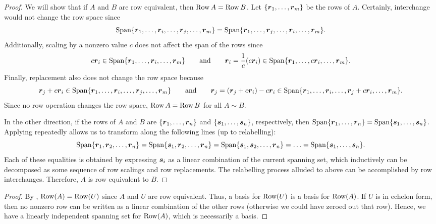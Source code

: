 \begin{proof} We will show that if $A$ and $B$ are row equivalent, then $\operatorname*{Row} A = \operatorname*{Row} B$. Let $\{\boldsymbol r_1, \ldots, \boldsymbol r_m\}$ be the rows of $A$. Certainly, interchange would not change the row space since 
\[\operatorname{Span}\{\boldsymbol r_1, \ldots, \boldsymbol r_i, \ldots, \boldsymbol r_j,\ldots, \boldsymbol r_m\} = \operatorname{Span}\{\boldsymbol r_1, \ldots, \boldsymbol r_j, \ldots, \boldsymbol r_i,\ldots, \boldsymbol r_m\}.\] Additionally, scaling by a nonzero value $c$ does not affect the span of the rows since 
\[c\boldsymbol r_i \in \operatorname{Span}\{\boldsymbol r_1, \ldots, \boldsymbol r_i, \ldots, \boldsymbol r_m\}\qquad\text{and}\qquad \boldsymbol r_i = \frac{1}{c}(c\boldsymbol r_i) \in \operatorname{Span}\{\boldsymbol r_1, \ldots, c\boldsymbol r_i, \ldots,  \boldsymbol r_m\}.\] Finally, replacement also does not change the row space because 
\[\boldsymbol r_j + c\boldsymbol r_i \in \operatorname{Span}\{\boldsymbol r_1, \ldots, \boldsymbol r_i, \ldots, \boldsymbol r_j,\ldots, \boldsymbol r_m\}\qquad\text{and}\qquad \boldsymbol r_j = (\boldsymbol r_j +c\boldsymbol r_i) - c\boldsymbol r_i \in \operatorname{Span}\{\boldsymbol r_1, \ldots, \boldsymbol r_i, \ldots, \boldsymbol r_j+c\boldsymbol r_i,\ldots, \boldsymbol r_m\}.\] Since no row operation changes the row space, $\operatorname*{Row} A = \operatorname*{Row} B$ for all $A\sim B$.

In the other direction, if the rows of $A$ and $B$ are $\{\boldsymbol r_1, \ldots, \boldsymbol r_n\}$ and $\{\boldsymbol s_1, \ldots, \boldsymbol s_n\}$, respectively, then $\operatorname{Span}\{\boldsymbol r_1, \ldots, \boldsymbol r_n\} = \operatorname{Span}\{\boldsymbol s_1, \ldots, \boldsymbol s_n\}$. Applying    repeatedly allows us to transform along the following lines (up to relabelling):
\[\operatorname{Span}\{\boldsymbol r_1, \boldsymbol r_2, \ldots, \boldsymbol r_n\} = \operatorname{Span}\{\boldsymbol s_1, \boldsymbol r_2, \ldots, \boldsymbol r_n\} = \operatorname{Span}\{\boldsymbol s_1, \boldsymbol s_2, \ldots, \boldsymbol r_n\} = \ldots =\operatorname{Span}\{\boldsymbol s_1, \ldots, \boldsymbol s_n\}.\] Each of these equalities is obtained by expressing $\boldsymbol s_i$ as a linear combination of the current spanning set, which inductively can be decomposed as some sequence of row scalings and row replacements. The relabelling process alluded to above can be accomplished by row interchanges. Therefore, $A$ is row equivalent to $B$.
\end{proof}\vs

\begin{proof}
By , $\operatorname*{Row}(A) = \operatorname*{Row}(U)$ since $A$ and $U$ are row equivalent. Thus, a basis for $\operatorname*{Row}(U)$ is a basis for $\operatorname*{Row}(A)$. If $U$ is in echelon form, then no nonzero row can be written as a linear combination of the other rows (otherwise we could have zeroed out that row). Hence, we have a linearly independent spanning set for $\operatorname*{Row}(A)$, which is necessarily a basis.
\end{proof}\vs


